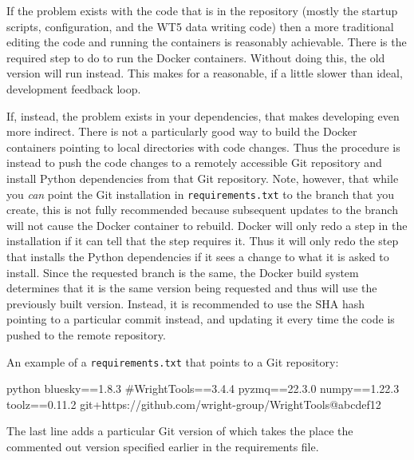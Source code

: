 If the problem exists with the code that is in the \biab repository (mostly the startup scripts, configuration, and the WT5 data writing code) then a more traditional editing the code and running the containers is reasonably achievable.
There is the required step to do  to run the Docker containers.
Without doing this, the old version will run instead.
This makes for a reasonable, if a little slower than ideal, development feedback loop.

If, instead, the problem exists in your dependencies, that makes developing even more indirect.
There is not a particularly good way to build the Docker containers pointing to local directories with code changes.
Thus the procedure is instead to push the code changes to a remotely accessible Git repository and install Python dependencies from that Git repository.
Note, however, that while you \textit{can} point the Git installation in \texttt{requirements.txt} to the branch that you create, this is not fully recommended because subsequent updates to the branch will not cause the Docker container to rebuild.
Docker will only redo a step in the installation if it can tell that the step requires it.
Thus it will only redo the step that installs the Python dependencies if it sees a change to what it is asked to install.
Since the requested branch is the same, the Docker build system determines that it is the same version being requested and thus will use the previously built version.
Instead, it is recommended to use the SHA hash pointing to a particular commit instead, and updating it every time the code is pushed to the remote repository.

An example of a \texttt{requirements.txt} that points to a Git repository:

\begin{codefragment}{python}
bluesky==1.8.3
#WrightTools==3.4.4
pyzmq==22.3.0
numpy==1.22.3
toolz==0.11.2
git+https://github.com/wright-group/WrightTools@abcdef12
\end{codefragment}

The last line adds a particular Git version of \wrighttools which takes the place the commented out version specified earlier in the requirements file.

